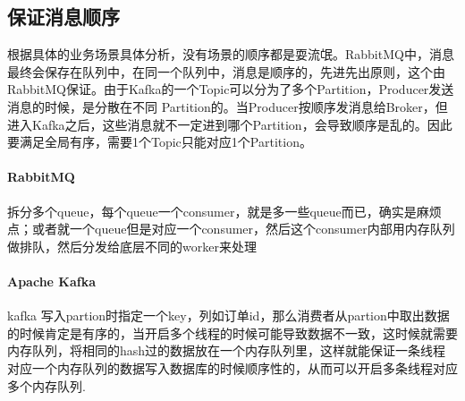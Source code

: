 \documentclass[../../../interview-questions.tex]{subfiles}
\begin{document}
\subsection{保证消息顺序}

根据具体的业务场景具体分析，没有场景的顺序都是耍流氓。RabbitMQ中，消息最终会保存在队列中，在同一个队列中，消息是顺序的，先进先出原则，这个由RabbitMQ保证。由于Kafka的一个Topic可以分为了多个Partition，Producer发送消息的时候，是分散在不同 Partition的。当Producer按顺序发消息给Broker，但进入Kafka之后，这些消息就不一定进到哪个Partition，会导致顺序是乱的。因此要满足全局有序，需要1个Topic只能对应1个Partition。

\paragraph{RabbitMQ}拆分多个queue，每个queue一个consumer，就是多一些queue而已，确实是麻烦点；或者就一个queue但是对应一个consumer，然后这个consumer内部用内存队列做排队，然后分发给底层不同的worker来处理

\paragraph{Apache Kafka}kafka 写入partion时指定一个key，列如订单id，那么消费者从partion中取出数据的时候肯定是有序的，当开启多个线程的时候可能导致数据不一致，这时候就需要内存队列，将相同的hash过的数据放在一个内存队列里，这样就能保证一条线程对应一个内存队列的数据写入数据库的时候顺序性的，从而可以开启多条线程对应多个内存队列.
\end{document}
